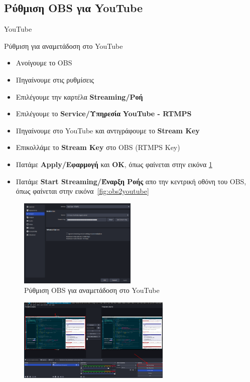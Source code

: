 \documentclass[aspectratio=169]{beamer}
\begin{document}
\subsection{Ρύθμιση OBS για YouTube}
\begin{frame}[allowframebreaks]{YouTube}
  \begin{block}{Ρύθμιση για αναμετάδοση στο YouTube}
    \begin{itemize}
      \item Ανοίγουμε το OBS
      \item Πηγαίνουμε στις ρυθμίσεις
      \item Επιλέγουμε την καρτέλα \textbf{Streaming/Ροή}
      \item Επιλέγουμε το \textbf{Service/Υπηρεσία} \textbf{YouTube - RTMPS}
      \item Πηγαίνουμε στο YouTube και αντιγράφουμε το \textbf{Stream Key}
      \item Επικολλάμε το \textbf{Stream Key} στο OBS (RTMPS Key)
      \item Πατάμε \textbf{Apply/Εφαρμογή} και \textbf{OK}, όπως φαίνεται στην εικόνα \ref{fig:settings}
      \item Πατάμε \textbf{Start Streaming/Έναρξη Ροής} απο την κεντρική οθόνη του OBS,
        όπως φαίνεται στην εικόνα~\ref{fig:obs2youtube}
    \end{itemize}
  \end{block}
  \begin{figure}
    \includegraphics[width=0.5\textwidth]{images/settings.png}
    \caption{Ρύθμιση OBS για αναμετάδοση στο YouTube}
    \label{fig:settings}
  \end{figure}
  \begin{figure}
    \includegraphics[width=0.65\textwidth]{images/obs2youtube.png}

\end{figure}
\end{frame}
\end{document}
